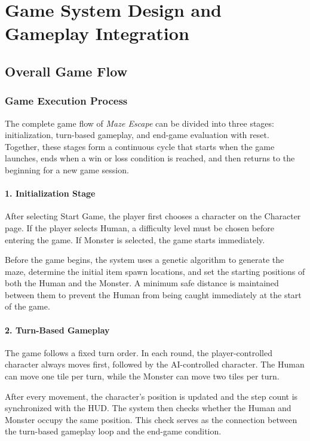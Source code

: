 \section{Game System Design and Gameplay Integration}

\subsection{Overall Game Flow}

\subsubsection{Game Execution Process}

The complete game flow of \textit{Maze Escape} can be divided into three stages: initialization, turn-based gameplay, and end-game evaluation with reset. Together, these stages form a continuous cycle that starts when the game launches, ends when a win or loss condition is reached, and then returns to the beginning for a new game session.

\paragraph{1. Initialization Stage}
After selecting Start Game, the player first chooses a character on the Character page. If the player selects Human, a difficulty level must be chosen before entering the game. If Monster is selected, the game starts immediately.

Before the game begins, the system uses a genetic algorithm to generate the maze, determine the initial item spawn locations, and set the starting positions of both the Human and the Monster. A minimum safe distance is maintained between them to prevent the Human from being caught immediately at the start of the game.

\paragraph{2. Turn-Based Gameplay}
The game follows a fixed turn order. In each round, the player-controlled character always moves first, followed by the AI-controlled character. The Human can move one tile per turn, while the Monster can move two tiles per turn.

After every movement, the character's position is updated and the step count is synchronized with the HUD. The system then checks whether the Human and Monster occupy the same position. This check serves as the connection between the turn-based gameplay loop and the end-game condition.

